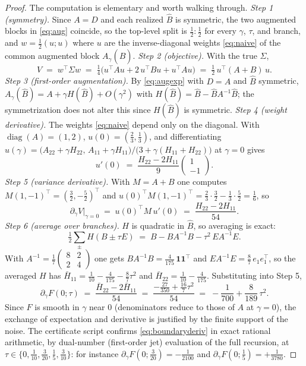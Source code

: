 \documentclass[11pt]{article}
\theoremstyle{remark}
\begin{document}
\begin{proof}
The computation is elementary and worth walking through. \emph{Step 1
(symmetry).} Since $A = D$ and each realized $\widehat B$ is symmetric, the
two augmented blocks in \eqref{eq:aug} coincide, so the top-level split is
$\tfrac12 : \tfrac12$ for every $\gamma$, $\tau$, and branch, and
$w = \tfrac12(u; u)$ where $u$ are the inverse-diagonal weights
\eqref{eq:naive} of the common augmented block $A_\gamma(\widehat B)$.
\emph{Step 2 (objective).} With the true $\Sigma$,
\[
  V \;=\; w^\top \Sigma w
  \;=\; \tfrac14\big(u^\top A u + 2\,u^\top B u + u^\top A u\big)
  \;=\; \tfrac12\, u^\top (A + B)\, u .
\]
\emph{Step 3 (first-order augmentation).} By \eqref{eq:augexp} with
$D = A$ and $\widehat B$ symmetric,
$A_\gamma(\widehat B) = A + \gamma H(\widehat B) + O(\gamma^2)$ with
$H(\widehat B) = \widehat B - \widehat B A^{-1} \widehat B$; the
symmetrization does not alter this since $H(\widehat B)$ is symmetric.
\emph{Step 4 (weight derivative).} The weights \eqref{eq:naive} depend only
on the diagonal. With $\operatorname{diag}(A) = (1, 2)$,
$u(0) = (\tfrac23, \tfrac13)$, and differentiating
$u(\gamma) = \big(A_{22} + \gamma H_{22},\, A_{11} + \gamma H_{11}\big) /
\big(3 + \gamma(H_{11} + H_{22})\big)$ at $\gamma = 0$ gives
\[
  u'(0) \;=\; \frac{H_{22} - 2 H_{11}}{9} \begin{pmatrix} 1 \\ -1
  \end{pmatrix}.
\]
\emph{Step 5 (variance derivative).} With $M = A + B$ one computes
$M (1, -1)^\top = (\tfrac{3}{2}, -\tfrac{5}{2})^\top$ and
$u(0)^\top M (1,-1)^\top = \tfrac{2}{3}\cdot\tfrac32 - \tfrac13\cdot\tfrac52
= \tfrac16$, so
\[
  \partial_\gamma V\big|_{\gamma=0}
  \;=\; u(0)^\top M\, u'(0)
  \;=\; \frac{H_{22} - 2H_{11}}{54}.
\]
\emph{Step 6 (average over branches).} $H$ is quadratic in $\widehat B$, so
averaging is exact:
\[
  \tfrac12\sum_{\pm} H(B \pm \tau E)
  \;=\; B - B A^{-1} B - \tau^2\, E A^{-1} E .
\]
With $A^{-1} = \tfrac17\left(\begin{smallmatrix} 8 & 2 \\ 2 & 4
\end{smallmatrix}\right)$ one gets
$B A^{-1} B = \tfrac{4}{175}\,\mathbf{1}\mathbf{1}^\top$ and
$E A^{-1} E = \tfrac{8}{7}\, e_1 e_1^\top$, so the averaged $H$ has
$\bar H_{11} = \tfrac{1}{10} - \tfrac{4}{175} - \tfrac{8}{7}\tau^2$ and
$\bar H_{22} = \tfrac{1}{10} - \tfrac{4}{175}$. Substituting into Step 5,
\[
  \partial_\gamma F(0;\tau)
  \;=\; \frac{\bar H_{22} - 2 \bar H_{11}}{54}
  \;=\; \frac{-\tfrac{27}{350} + \tfrac{16}{7}\tau^2}{54}
  \;=\; -\frac{1}{700} + \frac{8}{189}\,\tau^2 .
\]
Since $F$ is smooth in $\gamma$ near $0$ (denominators reduce to those of
$A$ at $\gamma = 0$), the exchange of expectation and derivative is
justified by the finite support of the noise. The certificate script
confirms \eqref{eq:boundaryderiv} in exact rational arithmetic, by
dual-number (first-order jet) evaluation of the full recursion, at
$\tau \in \{0, \tfrac{1}{10}, \tfrac{3}{20}, \tfrac15, \tfrac{3}{10}\}$:
for instance $\partial_\gamma F(0; \tfrac{3}{20}) = -\tfrac{1}{2100}$ and
$\partial_\gamma F(0; \tfrac15) = +\tfrac{1}{3780}$.
\end{proof}
\end{document}
